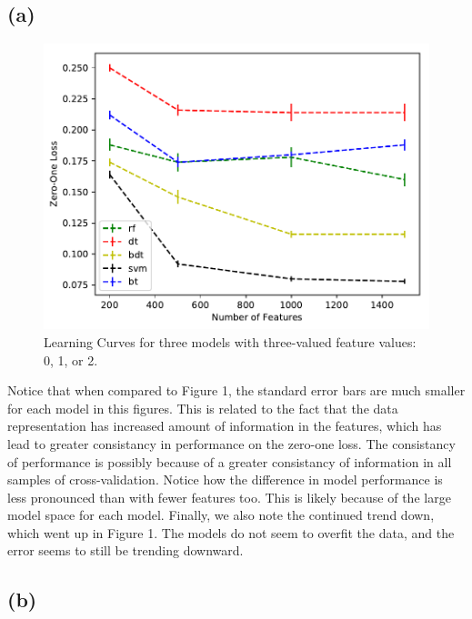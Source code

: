 \documentclass[11pt]{article}
\begin{document}
\subsection*{(a)}

\begin{minipage}{0.5\textwidth}
  \begin{figure}[H]
    \centering
    \includegraphics[width=\linewidth]{experiment_2}
    \caption{Learning Curves for three models with three-valued feature values: 0, 1, or 2.}
  \end{figure}
\end{minipage}%
\hspace{5mm}
\begin{minipage}{0.5\textwidth}
  Notice that when compared to Figure 1, the standard error bars are much smaller for each model in this figures. This is related to the fact that the data representation has increased amount of information in the features, which has lead to greater consistancy in performance on the zero-one loss. The consistancy of performance is possibly because of a greater consistancy of information in all samples of cross-validation. Notice how the difference in model performance is less pronounced than with fewer features too. This is likely because of the large model space for each model. Finally, we also note the continued trend down, which went up in Figure 1. The models do not seem to overfit the data, and the error seems to still be trending downward.
\end{minipage}


\subsection*{(b)}
\end{document}
